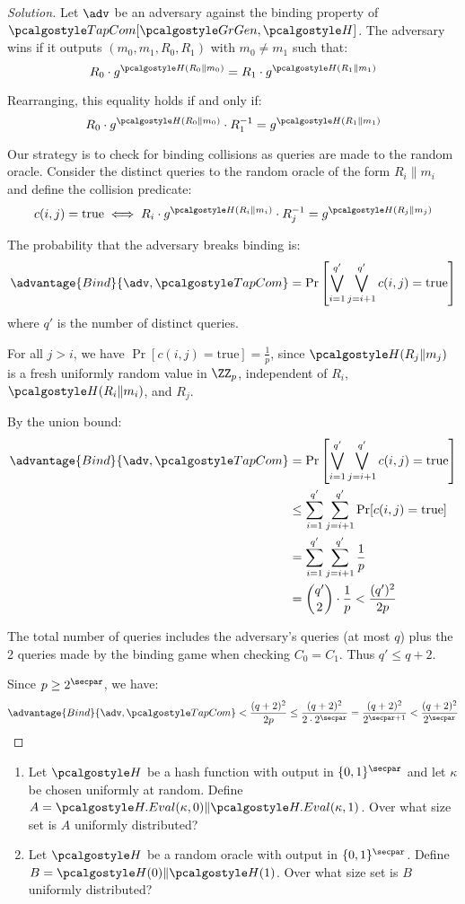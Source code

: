 \begin{proof}[Solution]
  Let $\adv$ be an adversary against the binding property of $\algo{TapCom}[\grgen, \algo{H}]$. The adversary wins if it outputs $(m_0, m_1, R_0, R_1)$ with $m_0 \neq m_1$ such that:
  \[
  R_0 \cdot g^{\algo{H}(R_0 \| m_0)} = R_1 \cdot g^{\algo{H}(R_1 \| m_1)}
  \]

  Rearranging, this equality holds if and only if:
  \[
  R_0 \cdot g^{\algo{H}(R_0 \| m_0)} \cdot R_1^{-1} = g^{\algo{H}(R_1 \| m_1)}
  \]

  Our strategy is to check for binding collisions as queries are made to the random oracle.
  Consider the distinct queries to the random oracle of the form $R_i \| m_i$ and define the collision predicate:
  \[
  c(i, j) = \text{true} \iff R_i \cdot g^{\algo{H}(R_i \| m_i)} \cdot R_j^{-1} = g^{\algo{H}(R_j \| m_j)}
  \]
  
  The probability that the adversary breaks binding is:
  \[
  \advantage{Bind}{\adv, \algo{TapCom}} = \Pr\left[\bigvee_{i=1}^{q'} \bigvee_{j=i+1}^{q'} c(i,j) = \text{true}\right]
  \]
  where $q'$ is the number of distinct queries.
  
  For all $j > i$, we have $\Pr[c(i,j) = \text{true}] = \frac{1}{p}$, since $\algo{H}(R_j \| m_j)$ is a fresh uniformly random value in $\ZZ_p$, independent of $R_i$, $\algo{H}(R_i \| m_i)$, and $R_j$.
  
  By the union bound:
  \begin{align}
    \advantage{Bind}{\adv, \algo{TapCom}} &= \Pr\left[\bigvee_{i=1}^{q'} \bigvee_{j=i+1}^{q'} c(i,j) = \text{true}\right] \\
    &\leq \sum_{i=1}^{q'} \sum_{j=i+1}^{q'} \Pr[c(i,j) = \text{true}] \\
    &= \sum_{i=1}^{q'} \sum_{j=i+1}^{q'} \frac{1}{p} \\
    &= \binom{q'}{2} \cdot \frac{1}{p} < \frac{(q')^2}{2p}
  \end{align}
  
  The total number of queries includes the adversary's queries (at most $q$) plus the 2 queries made by the binding game when checking $C_0 = C_1$. Thus $q' \leq q + 2$.
  
  Since $p \geq 2^\secpar$, we have:
  \[
  \advantage{Bind}{\adv, \algo{TapCom}} < \frac{(q+2)^2}{2p} \leq \frac{(q+2)^2}{2 \cdot 2^\secpar} = \frac{(q+2)^2}{2^{\secpar+1}} < \frac{(q+2)^2}{2^\secpar}
  \]
\end{proof}

\begin{exercise}[Optional]
  \begin{enumerate}
    \item Let $\algo{H}$ be a hash function with output in $\{0,1\}^\secpar$ and let $\kappa$ be chosen uniformly at random. Define $A = \algo{H.Eval}(\kappa, 0) \| \algo{H.Eval}(\kappa, 1)$. Over what size set is $A$ uniformly distributed?
    \item Let $\algo{H}$ be a random oracle with output in $\{0,1\}^\secpar$. Define $B = \algo{H}(0) \| \algo{H}(1)$. Over what size set is $B$ uniformly distributed?
  \end{enumerate}
\end{exercise}


